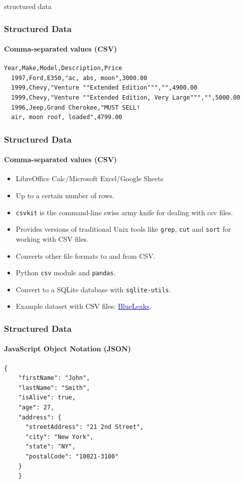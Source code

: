 \documentclass[aspectratio=169,usenames,dvipsnames]{beamer}
\begin{document}
\begin{frame}[c]

  \LARGE
  \centering
  structured data

\end{frame}

\begin{frame}[fragile]
  \frametitle{Structured Data}
  \framesubtitle{Comma-separated values (CSV)}

  \begin{lstlisting}[basicstyle=\scriptsize]
  Year,Make,Model,Description,Price
  1997,Ford,E350,"ac, abs, moon",3000.00
  1999,Chevy,"Venture ""Extended Edition""","",4900.00
  1999,Chevy,"Venture ""Extended Edition, Very Large""","",5000.00
  1996,Jeep,Grand Cherokee,"MUST SELL!
  air, moon roof, loaded",4799.00
  \end{lstlisting}
\end{frame}

\begin{frame}
  \frametitle{Structured Data}
  \framesubtitle{Comma-separated values (CSV)}

  \begin{itemize}[<+->]
    \item LibreOffice Calc/Microsoft Excel/Google Sheets
    \item Up to a certain number of rows.
    \item \texttt{csvkit} is the command-line swiss army knife for dealing
      with csv files.
    \item Provides versions of traditional Unix tools like \texttt{grep},
      \texttt{cut} and \texttt{sort} for working with CSV files.
    \item Converts other file formats to and from CSV.
    \item Python \texttt{csv} module and \texttt{pandas}.
    \item Convert to a SQLite database with \texttt{sqlite-utils}.
    \item Example dataset with CSV files:
      \href{https://ddosecrets.com/wiki/BlueLeaks}{\textcolor{blue}{BlueLeaks}}.
  \end{itemize}

\end{frame}

\begin{frame}[fragile]
  \frametitle{Structured Data}
  \framesubtitle{JavaScript Object Notation (JSON)}

  \begin{lstlisting}[basicstyle=\scriptsize]
  {
    "firstName": "John",
    "lastName": "Smith",
    "isAlive": true,
    "age": 27,
    "address": {
      "streetAddress": "21 2nd Street",
      "city": "New York",
      "state": "NY",
      "postalCode": "10021-3100"
    }
    }
  \end{lstlisting}
\end{frame}
\end{document}
